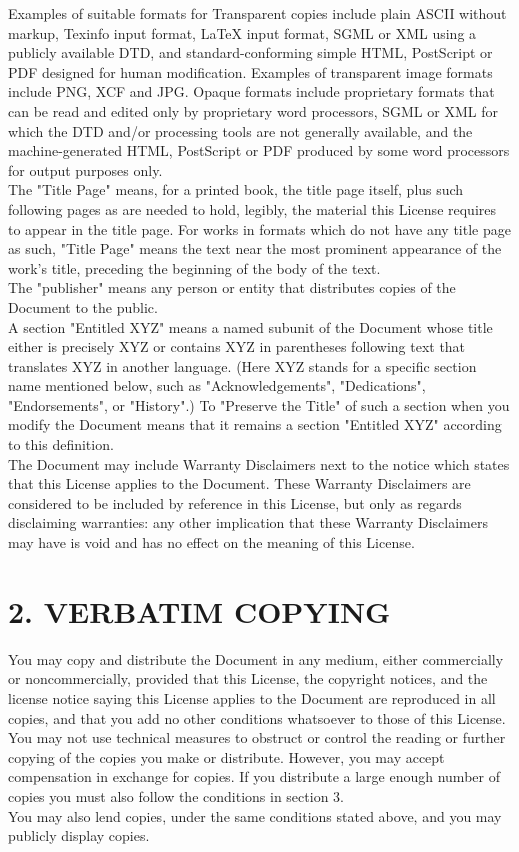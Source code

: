 Examples of suitable formats for Transparent copies include plain ASCII without markup, Texinfo input format, LaTeX input format, SGML or XML using a publicly available DTD, and standard-conforming simple HTML, PostScript or PDF designed for human modification. Examples of transparent image formats include PNG, XCF and JPG. Opaque formats include proprietary formats that can be read and edited only by proprietary word processors, SGML or XML for which the DTD and/or processing tools are not generally available, and the machine-generated HTML, PostScript or PDF produced by some word processors for output purposes only.\\
The "Title Page" means, for a printed book, the title page itself, plus such following pages as are needed to hold, legibly, the material this License requires to appear in the title page. For works in formats which do not have any title page as such, "Title Page" means the text near the most prominent appearance of the work's title, preceding the beginning of the body of the text.\\
The "publisher" means any person or entity that distributes copies of the Document to the public.\\
A section "Entitled XYZ" means a named subunit of the Document whose title either is precisely XYZ or contains XYZ in parentheses following text that translates XYZ in another language. (Here XYZ stands for a specific section name mentioned below, such as "Acknowledgements", "Dedications", "Endorsements", or "History".) To "Preserve the Title" of such a section when you modify the Document means that it remains a section "Entitled XYZ" according to this definition.\\
The Document may include Warranty Disclaimers next to the notice which states that this License applies to the Document. These Warranty Disclaimers are considered to be included by reference in this License, but only as regards disclaiming warranties: any other implication that these Warranty Disclaimers may have is void and has no effect on the meaning of this License.

\section{2. VERBATIM COPYING}



You may copy and distribute the Document in any medium, either commercially or noncommercially, provided that this License, the copyright notices, and the license notice saying this License applies to the Document are reproduced in all copies, and that you add no other conditions whatsoever to those of this License. You may not use technical measures to obstruct or control the reading or further copying of the copies you make or distribute. However, you may accept compensation in exchange for copies. If you distribute a large enough number of copies you must also follow the conditions in section 3.\\
You may also lend copies, under the same conditions stated above, and you may publicly display copies.

